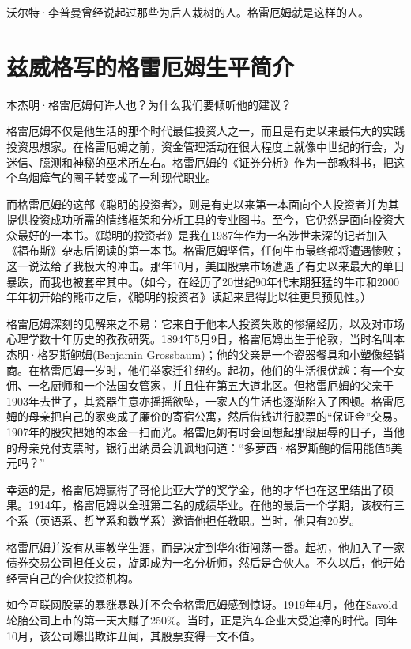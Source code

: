 \documentclass[12pt,oneside]{book}
\begin{document}
沃尔特·李普曼曾经说起过那些为后人栽树的人。格雷厄姆就是这样的人。

\section{兹威格写的格雷厄姆生平简介}
本杰明·格雷厄姆何许人也？为什么我们要倾听他的建议？

格雷厄姆不仅是他生活的那个时代最佳投资人之一，而且是有史以来最伟大的实践投资思想家。在格雷厄姆之前，资金管理活动在很大程度上就像中世纪的行会，为迷信、臆测和神秘的巫术所左右。格雷厄姆的《证券分析》作为一部教科书，把这个乌烟瘴气的圈子转变成了一种现代职业。

而格雷厄姆的这部《聪明的投资者》，则是有史以来第一本面向个人投资者并为其提供投资成功所需的情绪框架和分析工具的专业图书。至今，它仍然是面向投资大众最好的一本书。《聪明的投资者》是我在1987年作为一名涉世未深的记者加入《福布斯》杂志后阅读的第一本书。格雷厄姆坚信，任何牛市最终都将遭遇惨败；这一说法给了我极大的冲击。那年10月，美国股票市场遭遇了有史以来最大的单日暴跌，而我也被套牢其中。（如今，在经历了20世纪90年代末期狂猛的牛市和2000年年初开始的熊市之后，《聪明的投资者》读起来显得比以往更具预见性。）

格雷厄姆深刻的见解来之不易：它来自于他本人投资失败的惨痛经历，以及对市场心理学数十年历史的孜孜研究。1894年5月9日，格雷厄姆出生于伦敦，当时名叫本杰明·格罗斯鲍姆(Benjamin Grossbaum)；他的父亲是一个瓷器餐具和小塑像经销商。在格雷厄姆一岁时，他们举家迁往纽约。起初，他们的生活很优越：有一个女佣、一名厨师和一个法国女管家，并且住在第五大道北区。但格雷厄姆的父亲于1903年去世了，其瓷器生意亦摇摇欲坠，一家人的生活也逐渐陷入了困顿。格雷厄姆的母亲把自己的家变成了廉价的寄宿公寓，然后借钱进行股票的“保证金”交易。1907年的股灾把她的本金一扫而光。格雷厄姆有时会回想起那段屈辱的日子，当他的母亲兑付支票时，银行出纳员会讥讽地问道：“多萝西·格罗斯鲍的信用能值5美元吗？”

幸运的是，格雷厄姆赢得了哥伦比亚大学的奖学金，他的才华也在这里结出了硕果。1914年，格雷厄姆以全班第二名的成绩毕业。在他的最后一个学期，该校有三个系（英语系、哲学系和数学系）邀请他担任教职。当时，他只有20岁。

格雷厄姆并没有从事教学生涯，而是决定到华尔街闯荡一番。起初，他加入了一家债券交易公司担任文员，旋即成为一名分析师，然后是合伙人。不久以后，他开始经营自己的合伙投资机构。

如今互联网股票的暴涨暴跌并不会令格雷厄姆感到惊讶。1919年4月，他在Savold轮胎公司上市的第一天大赚了250\%。当时，正是汽车企业大受追捧的时代。同年10月，该公司爆出欺诈丑闻，其股票变得一文不值。
\end{document}
